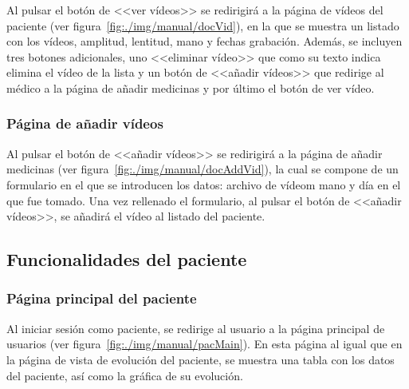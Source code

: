 Al pulsar el botón de <<ver vídeos>> se redirigirá a la página de vídeos del paciente (ver figura~\ref{fig:./img/manual/docVid}), en la que se muestra un listado con los vídeos, amplitud, lentitud, mano y fechas grabación. Además, se incluyen tres botones adicionales, uno <<eliminar vídeo>> que como su texto indica elimina el vídeo de la lista y un botón de <<añadir vídeos>> que redirige al médico a la página de añadir medicinas y por último el botón de ver vídeo.


\subsubsection{Página de añadir vídeos}

Al pulsar el botón de <<añadir vídeos>> se redirigirá a la página de añadir medicinas (ver figura~\ref{fig:./img/manual/docAddVid}), la cual se compone de un formulario en el que se introducen los datos: archivo de vídeom mano y día en el que fue tomado. Una vez rellenado el formulario, al pulsar el botón de <<añadir vídeos>>, se añadirá el vídeo al listado del paciente.


\subsection{Funcionalidades del paciente}

\subsubsection{Página principal del paciente}

Al iniciar sesión como paciente, se redirige al usuario a la página principal de usuarios (ver figura~\ref{fig:./img/manual/pacMain}). En esta página al igual que en la página de vista de evolución del paciente, se muestra una tabla con los datos del paciente, así como la gráfica de su evolución.



